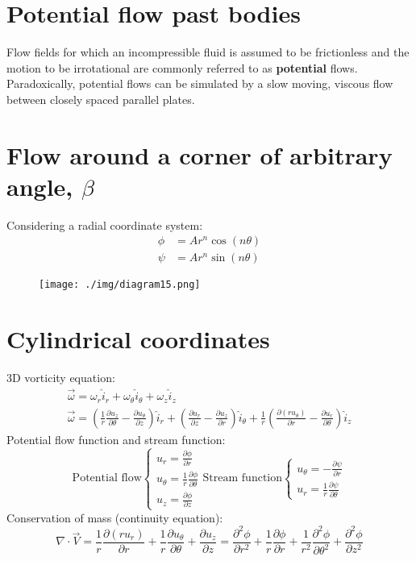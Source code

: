 \section{Potential flow past bodies}
Flow fields for which an incompressible fluid is assumed to be frictionless and the motion to be irrotational are commonly referred to as \textbf{potential} flows. Paradoxically, potential flows can be simulated by a slow moving, viscous flow between closely spaced parallel plates.
\section{Flow around a corner of arbitrary angle, $\beta$}
Considering a radial coordinate system:
\begin{align}
  \phi & = A r^n \cos(n\theta) \\
  \psi & = Ar^n \sin(n\theta)
\end{align}
\begin{figure}[H]
  \centering
  \texttt{[image: ./img/diagram15.png]}
\end{figure}
\section{Cylindrical coordinates}
3D vorticity equation:
\begin{gather}
  \vec{\omega} = \omega_r \hat{i}_r + \omega_{\theta} \hat{i}_{\theta} + \omega_z \hat{i}_z\\
  \vec{\omega} = \left(\frac{1}{r}\frac{\partial u_z}{\partial \theta} - \frac{\partial u_{\theta}}{\partial z}\right) \hat{i}_r + \left(\frac{\partial u_r}{\partial z} - \frac{\partial u_z}{\partial r}\right) \hat{i}_{\theta} + \frac{1}{r}\left(\frac{\partial (ru_{\theta})}{\partial r}-\frac{\partial u_r}{\partial \theta}\right)\hat{i}_z
\end{gather}
Potential flow function and stream function:
\begin{equation}
  \textrm{Potential flow}\begin{cases}
    u_r = \frac{\partial \phi}{\partial r}                        \\
    u_{\theta} = \frac{1}{r}\frac{\partial \phi}{\partial \theta} \\
    u_z = \frac{\partial \phi}{\partial z}
  \end{cases}
  \textrm{Stream function}\begin{cases}
    u_{\theta} = - \frac{\partial \psi}{\partial r} \\
    u_r = \frac{1}{r} \frac{\partial \psi}{\partial \theta}
  \end{cases}
\end{equation}
Conservation of mass (continuity equation):
\begin{equation}
  \nabla \cdot \vec{V} = \frac{1}{r} \frac{\partial (r u_r)}{\partial r} + \frac{1}{r} \frac{\partial u_{\theta}}{\partial \theta} + \frac{\partial u_z}{\partial z} = \frac{\partial^2 \phi}{\partial r^2} + \frac{1}{r}\frac{\partial \phi}{\partial r} +\frac{1}{r^2} \frac{\partial^2 \phi}{\partial \theta^2} + \frac{\partial^2 \phi}{\partial z^2}
\end{equation}